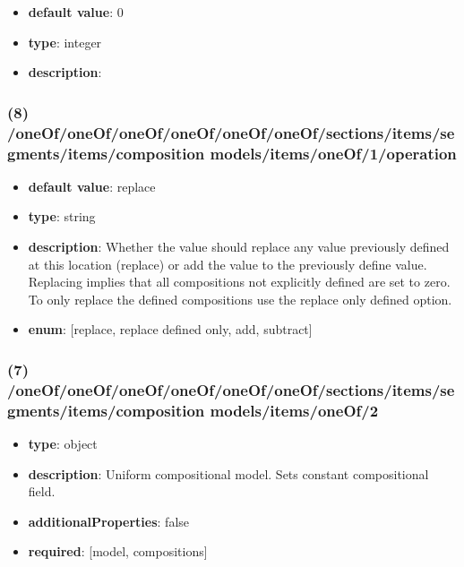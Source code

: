 \begin{itemize}[leftmargin=9em]\item {\bf default value}: 0
\item {\bf type}: integer
\item {\bf description}: 
\end{itemize}\subsubsection{(8) /oneOf/oneOf/oneOf/oneOf/oneOf/oneOf/sections/items/segments/items/composition models/items/oneOf/1/operation}
\begin{itemize}[leftmargin=8em]\item {\bf default value}: replace
\item {\bf type}: string
\item {\bf description}: Whether the value should replace any value previously defined at this location (replace) or add the value to the previously define value. Replacing implies that all compositions not explicitly defined are set to zero. To only replace the defined compositions use the replace only defined option.
\item {\bf enum}: [replace, replace defined only, add, subtract]\end{itemize}\subsubsection{(7) /oneOf/oneOf/oneOf/oneOf/oneOf/oneOf/sections/items/segments/items/composition models/items/oneOf/2}
\begin{itemize}[leftmargin=7em]\item {\bf type}: object
\item {\bf description}: Uniform compositional model. Sets constant compositional field.
\item {\bf additionalProperties}: false
\item {\bf required}: [model, compositions]\end{itemize}
